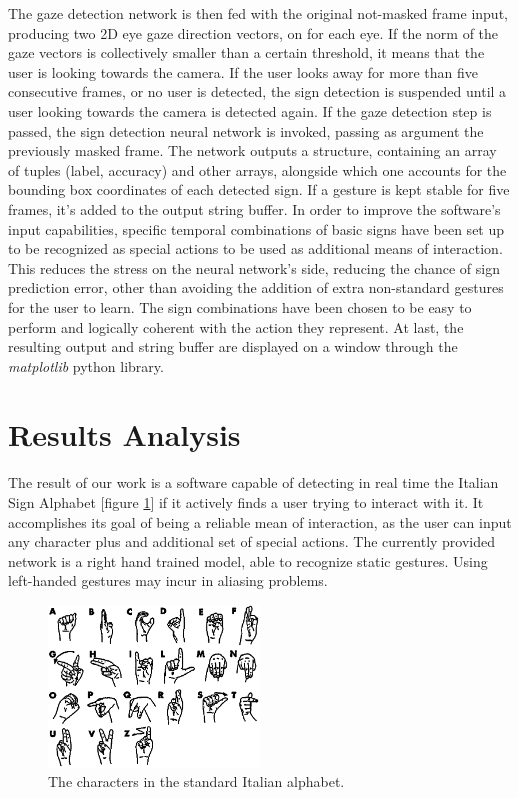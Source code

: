 \documentclass[a4paper, 12pt]{article}
\begin{document}
The gaze detection network is then fed with the original not-masked frame input, producing two 2D eye gaze direction vectors, on for each eye. If the norm of the gaze vectors is collectively smaller than a certain threshold, it means that the user is looking towards the camera. If the user looks away for more than five consecutive frames, or no user is detected, the sign detection is suspended until a user looking towards the camera is detected again.\linebreak
If the gaze detection step is passed, the sign detection neural network is invoked, passing as argument the previously masked frame. The network outputs a structure, containing an array of tuples (label, accuracy) and other arrays, alongside which one accounts for the bounding box coordinates of each detected sign.\linebreak
If a gesture is kept stable for five frames, it's added to the output string buffer. In order to improve the software's input capabilities, specific temporal combinations of basic signs have been set up to be recognized as special actions to be used as additional means of interaction. This reduces the stress on the neural network's side, reducing the chance of sign prediction error, other than avoiding the addition of extra non-standard gestures for the user to learn. The sign combinations have been chosen to be easy to perform and logically coherent with the action they represent.\linebreak
At last, the resulting output and string buffer are displayed on a window through the \textit{matplotlib} python library.

\section{Results Analysis}
\label{ResutsAndAnalysis}
The result of our work is a software capable of detecting in real time the Italian Sign Alphabet [figure \ref{fig:sign}] if it actively finds a user trying to interact with it. It accomplishes its goal of being a reliable mean of interaction, as the user can input any character plus and additional set of special actions.\linebreak
The currently provided network is a right hand trained model, able to recognize static gestures. Using left-handed gestures may incur in aliasing problems.
\begin{figure}[!h]
    \centering
    \includegraphics[width=0.5\textwidth]{resources/image/sign.png} \caption{The characters in the standard Italian alphabet.} \label{fig:sign}
\end{figure}
\end{document}

